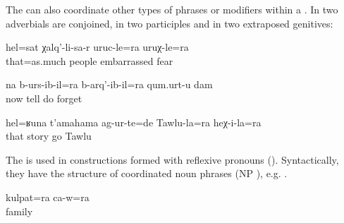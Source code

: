 The  can also coordinate other types of phrases or modifiers within a . In  two adverbials are conjoined, in  two participles and in  two extraposed genitives:
%
\begin{exe}
	\ex	\label{ex:‎‎‎as much as being embarrassed and anxious in front of people}
	\gll	hel=sat	χalq'-li-sa-r	uruc-le=ra		uruχ-le=ra\\
		that=as.much	people	embarrassed\tsc{-advz=add}	fear\\
	\glt	{}

	\ex	\label{ex:‎Now I forget what I say and what I do}
	\gll	na	b-urs-ib-il=ra	b-arq'-ib-il=ra	qum.urt-u	dam\\
		now	tell do	forget	\\
	\glt	{}

	\ex	\label{ex:‎Such a story happened to Tawlu and him}
	\gll	hel=ʁuna	t'amahama	ag-ur-te=de	Tawlu-la=ra	heχ-i-la=ra\\
		that	story	go	Tawlu	\\
	\glt	{}
\end{exe}

The  is used in  constructions formed with reflexive pronouns (). Syntactically, they have the structure of coordinated noun phrases (NP ), e.g. .
%
\begin{exe}
	\ex	\label{ex:with his family}
	\gll	kulpat=ra ca-w=ra\\
		family	\\
	\glt	{}
\end{exe}

